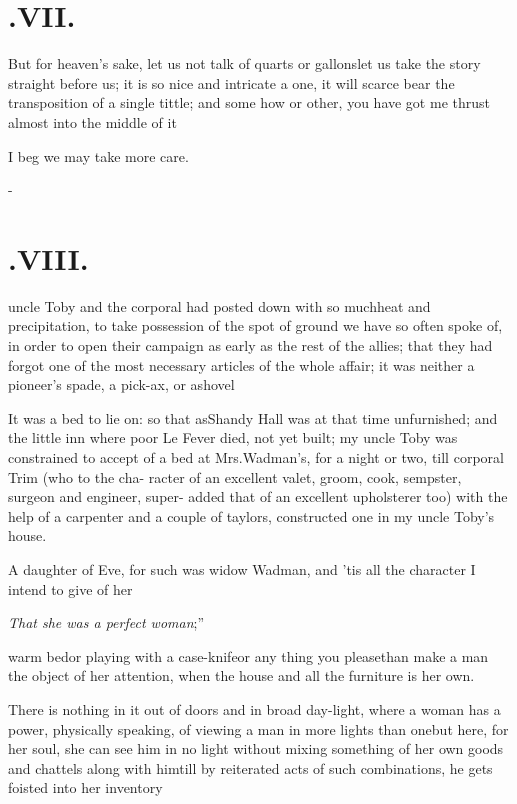 \documentclass{article}
\begin{document}
\section{.\enspace VII.}

\quad\tsk But for heaven’s sake, let us not 
talk of quarts or gallons\tsk let us take\break 
the story straight before us; it is so nice\break
and intricate a one, it will scarce bear\break
the transposition of a single tittle; and\break
some how or other, you have got me\break
thrust almost into the middle of it\tsk

\tsh I beg we may take more care.

\vfill{}\eject
\null\kern-\baselineskip
\section{.\enspace VIII.}

 uncle Toby and the corporal
had posted down with so much\break heat and precipitation, to take
possession of the spot of ground we have so often spoke of, in
order to open their campaign as early as the rest of the allies;
that they had forgot one of the most necessary articles of the
whole affair; it was neither a pioneer’s spade, a pick-ax, or
a\break shovel\tsk

\tsh It was a bed to lie on: so that as\break Shandy Hall was
at that time unfurn\-ish\-ed; and the little inn where poor Le
Fever died, not yet built; my uncle Toby was constrained
to accept of a bed at Mrs.\@ Wadman’s, for a night or
two, 
till corporal Trim (who to the cha-\break
racter of an excellent valet, groom, cook,\break
sempster, surgeon and engineer, super-\break
added that of an excellent upholsterer\break
too) with the help of a carpenter and a\break
couple of taylors, constructed one in my\break
uncle Toby’s house.

A daughter of Eve, for such was wi\-dow Wadman, and
’tis all the character I intend to give of her\tsk 

\tsk\lqq\textit{That she was a perfect woman};”

\noindent
{}
warm bed\tsk or playing with a case-knife\break\tsk or any thing
you please\tsk than make a man the object of her attention,
when\break
the house and all the furniture is her own.

There is nothing in it out of doors and in broad day-light,
where a woman has a power, physically speaking, of viewing a man in
more lights than one\tsk but here, for her soul, she can see him
in no light without mixing something of her own goods and chattels
along with him\tsh till by reiterated acts of such
combinations, he gets foisted into her inventory\tsh
\end{document}

